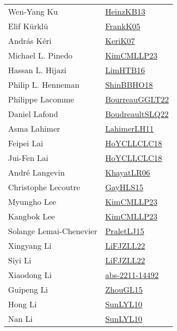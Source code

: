 {\begin{longtable}{p{4cm}p{20cm}}
Wen{-}Yang Ku & \href{papers/HeinzKB13.pdf}{HeinzKB13}\cite{HeinzKB13} \\
Elif K{\"{u}}rkl{\"{u}} & \href{papers/FrankK05.pdf}{FrankK05}\cite{FrankK05} \\
Andr{\'{a}}s K{\'{e}}ri & \href{papers/KeriK07.pdf}{KeriK07}\cite{KeriK07} \\
Michael L. Pinedo & \href{papers/KimCMLLP23.pdf}{KimCMLLP23}\cite{KimCMLLP23} \\
Hassan L. Hijazi & \href{papers/LimHTB16.pdf}{LimHTB16}\cite{LimHTB16} \\
Philip L. Henneman & \href{articles/ShinBBHO18.pdf}{ShinBBHO18}\cite{ShinBBHO18} \\
Philippe Lacomme & \href{articles/BourreauGGLT22.pdf}{BourreauGGLT22}\cite{BourreauGGLT22} \\
Daniel Lafond & \href{papers/BoudreaultSLQ22.pdf}{BoudreaultSLQ22}\cite{BoudreaultSLQ22} \\
Asma Lahimer & \href{papers/LahimerLH11.pdf}{LahimerLH11}\cite{LahimerLH11} \\
Feipei Lai & \href{papers/HoYCLLCLC18.pdf}{HoYCLLCLC18}\cite{HoYCLLCLC18} \\
Jui{-}Fen Lai & \href{papers/HoYCLLCLC18.pdf}{HoYCLLCLC18}\cite{HoYCLLCLC18} \\
Andr{\'{e}} Langevin & \href{articles/KhayatLR06.pdf}{KhayatLR06}\cite{KhayatLR06} \\
Christophe Lecoutre & \href{papers/GayHLS15.pdf}{GayHLS15}\cite{GayHLS15} \\
Myungho Lee & \href{papers/KimCMLLP23.pdf}{KimCMLLP23}\cite{KimCMLLP23} \\
Kangbok Lee & \href{papers/KimCMLLP23.pdf}{KimCMLLP23}\cite{KimCMLLP23} \\
Solange Lemai{-}Chenevier & \href{papers/PraletLJ15.pdf}{PraletLJ15}\cite{PraletLJ15} \\
Xingyang Li & \href{papers/LiFJZLL22.pdf}{LiFJZLL22}\cite{LiFJZLL22} \\
Siyi Li & \href{papers/LiFJZLL22.pdf}{LiFJZLL22}\cite{LiFJZLL22} \\
Xiaodong Li & \href{articles/abs-2211-14492.pdf}{abs-2211-14492}\cite{abs-2211-14492} \\
Guipeng Li & \href{papers/ZhouGL15.pdf}{ZhouGL15}\cite{ZhouGL15} \\
Hong Li & \href{papers/SunLYL10.pdf}{SunLYL10}\cite{SunLYL10} \\
Nan Li & \href{papers/SunLYL10.pdf}{SunLYL10}\cite{SunLYL10} \\

\end{longtable}}
